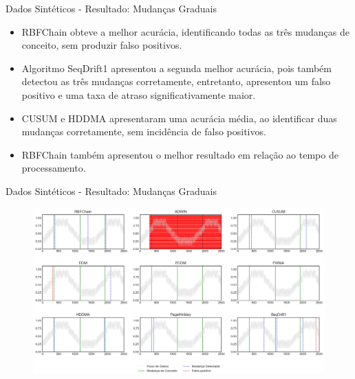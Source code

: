 \documentclass[10pt]{beamer}
\begin{document}
\begin{frame}{Dados Sintéticos - Resultado: Mudanças Graduais}
    \begin{itemize}
        \item RBFChain obteve a melhor acurácia, identificando todas as três mudanças de conceito, sem produzir falso positivos.
        \item Algoritmo SeqDrift1 apresentou a segunda melhor acurácia, pois também detectou as três mudanças corretamente, entretanto, apresentou um falso positivo e uma taxa de atraso significativamente maior.
        \item CUSUM e HDDMA apresentaram uma acurácia média, ao identificar duas mudanças corretamente, sem incidência de falso positivos.
        \item RBFChain também apresentou o melhor resultado em relação ao tempo de processamento.
    \end{itemize}
\end{frame}

\begin{frame}{Dados Sintéticos - Resultado: Mudanças Graduais}
    \begin{figure}[t]
        \begin{center}
            \includegraphics[width=\textwidth]{imagens/gradual.png}
        \end{center}
    \end{figure}
\end{frame}
\end{document}
